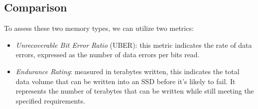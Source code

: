 \subsection{Comparison}
To assess these two memory types, we can utilize two metrics:
\begin{itemize}
    \item \textit{Unrecoverable Bit Error Ratio} (UBER): this metric indicates the rate of data errors, expressed as the number of data errors per bits read.
    \item \textit{Endurance Rating}: measured in terabytes written, this indicates the total data volume that can be written into an SSD before it's likely to fail. 
        It represents the number of terabytes that can be written while still meeting the specified requirements.
\end{itemize}